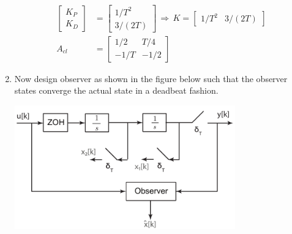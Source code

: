 \documentclass[twoside]{article}
\begin{document}
\begin{enumerate}
\begin{align*}
	\\
	\begin{bmatrix} K_P \\ K_D \end{bmatrix} &= \begin{bmatrix} 1/T^2 \\ 3/(2 T) \end{bmatrix}
	\, \Rightarrow \, K =  \begin{bmatrix} 1/T^2 & 3/(2 T) \end{bmatrix}
	\\
	A_{cl} &= \begin{bmatrix} 1/2 & T/4 \\ -1/T & -1/2  \end{bmatrix}
\end{align*}

\item Now design observer as shown in the figure below such that the observer states converge the actual state in a deadbeat fashion.
		
\begin{center}
  \begin{minipage}[h]{0.9\linewidth}
    \begin{center}
      \includegraphics[width=0.75\textwidth]{block_open-loop-obs}
    \end{center}
  \end{minipage}
    \end{center}


\end{enumerate}
\end{document}
